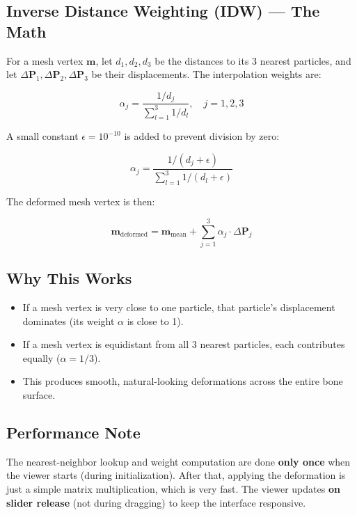 \documentclass[12pt,a4paper]{article}
\begin{document}
\subsection{Inverse Distance Weighting (IDW) --- The Math}

For a mesh vertex $\mathbf{m}$, let $d_1, d_2, d_3$ be the distances to its 3 nearest particles, and let $\Delta \mathbf{P}_1, \Delta \mathbf{P}_2, \Delta \mathbf{P}_3$ be their displacements. The interpolation weights are:

\begin{equation}
\alpha_j = \frac{1/d_j}{\sum_{l=1}^{3} 1/d_l}, \quad j = 1, 2, 3
\end{equation}

A small constant $\epsilon = 10^{-10}$ is added to prevent division by zero:

\begin{equation}
\alpha_j = \frac{1/(d_j + \epsilon)}{\sum_{l=1}^{3} 1/(d_l + \epsilon)}
\end{equation}

The deformed mesh vertex is then:

\begin{equation}
\mathbf{m}_{\text{deformed}} = \mathbf{m}_{\text{mean}} + \sum_{j=1}^{3} \alpha_j \cdot \Delta \mathbf{P}_j
\end{equation}

\subsection{Why This Works}

\begin{itemize}[itemsep=0.5em]
    \item If a mesh vertex is very close to one particle, that particle's displacement dominates (its weight $\alpha$ is close to 1).
    \item If a mesh vertex is equidistant from all 3 nearest particles, each contributes equally ($\alpha = 1/3$).
    \item This produces smooth, natural-looking deformations across the entire bone surface.
\end{itemize}

\subsection{Performance Note}

The nearest-neighbor lookup and weight computation are done \textbf{only once} when the viewer starts (during initialization). After that, applying the deformation is just a simple matrix multiplication, which is very fast. The viewer updates \textbf{on slider release} (not during dragging) to keep the interface responsive.
\end{document}
